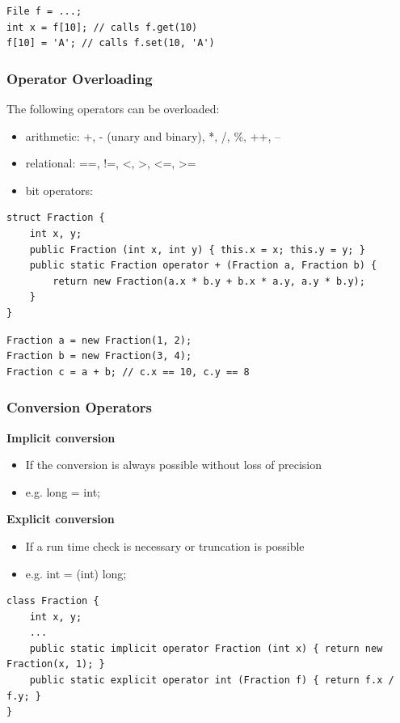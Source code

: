 \begin{lstlisting}
File f = ...;
int x = f[10]; // calls f.get(10)
f[10] = 'A'; // calls f.set(10, 'A')
\end{lstlisting}

\subsubsection{Operator Overloading}
The following operators can be overloaded:
\begin{itemize}
	\item arithmetic:		+, - (unary and binary), *, /, \%, ++, --
	\item relational:		==, !=, <, >, <=, >=
	\item bit operators:				
\end{itemize}
\begin{multicols}{2}
\begin{lstlisting}
struct Fraction {
	int x, y;
	public Fraction (int x, int y) { this.x = x; this.y = y; }
	public static Fraction operator + (Fraction a, Fraction b) {
		return new Fraction(a.x * b.y + b.x * a.y, a.y * b.y);
	}
}
\end{lstlisting}
\columnbreak
\begin{lstlisting}
Fraction a = new Fraction(1, 2);
Fraction b = new Fraction(3, 4);
Fraction c = a + b; // c.x == 10, c.y == 8
\end{lstlisting}
\end{multicols}

\subsubsection{Conversion Operators}
\begin{multicols}{2}
\textbf{Implicit conversion}
\begin{itemize}
	\item If the conversion is always possible without loss of precision
	\item e.g. long = int;
\end{itemize}
\columnbreak
\textbf{Explicit conversion}
\begin{itemize}
	\item If a run time check is necessary or truncation is possible
	\item e.g. int = (int) long;
\end{itemize}
\end{multicols}


\begin{lstlisting}
class Fraction {
	int x, y;
	...
	public static implicit operator Fraction (int x) { return new Fraction(x, 1); }
	public static explicit operator int (Fraction f) { return f.x / f.y; }
}
\end{lstlisting}

